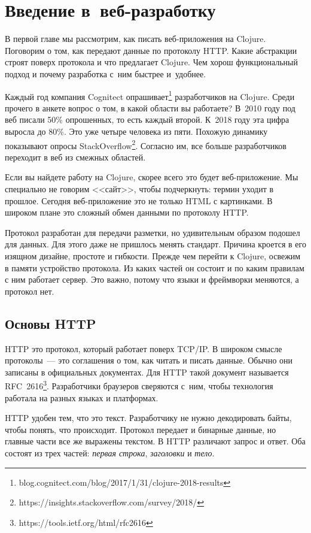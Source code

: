 \chapter{Введение в~веб-разработку}

\begin{teaser}
В первой главе мы рассмотрим, как писать веб-приложения на Clojure. Поговорим о
том, как передают данные по протоколу HTTP. Какие абстракции строят поверх
протокола и что предлагает Clojure. Чем хорош функциональный подход и почему
разработка с~ним быстрее и~удобнее.
\end{teaser}

Каждый год компания Cognitect опрашивает\footnote{blog.cognitect.com/blog/2017/1/31/clojure-2018-results}
разработчиков на Clojure. Среди прочего в анкете вопрос о том, в какой области вы работаете? В~2010 году под
веб писали 50\% опрошенных, то есть каждый второй. К~2018 году
эта цифра выросла до 80\%. Это уже четыре человека из пяти. Похожую динамику показывают
опросы StackOverflow\footnote{https://insights.stackoverflow.com/survey/2018/}.
Согласно им, все больше разработчиков переходит в веб из смежных областей.

Если вы найдете работу на Clojure, скорее всего это будет веб-приложение. Мы
специально не говорим <<сайт>>, чтобы подчеркнуть: термин уходит в
прошлое. Сегодня веб-приложение это не только HTML с картинками. В широком плане
это сложный обмен данными по протоколу HTTP.

Протокол разработан для передачи разметки, но удивительным образом подошел для
данных. Для этого даже не пришлось менять стандарт. Причина кроется в его
изящном дизайне, простоте и гибкости. Прежде чем перейти к Clojure, освежим в
памяти устройство протокола. Из каких частей он состоит и по каким правилам с
ним работает сервер. Это важно, потому что языки и фреймворки меняются, а
протокол нет.

\section{Основы HTTP}

HTTP это протокол, который работает поверх TCP/IP. В широком смысле протоколы~---
это соглашения о том, как читать и писать данные. Обычно они записаны в официальных
документах. Для HTTP такой документ называется RFC~2616\footnote{https://tools.ietf.org/html/rfc2616}.
Разработчики браузеров сверяются с~ним, чтобы технология работала
на разных языках и платформах.

HTTP удобен тем, что это текст. Разработчику не нужно декодировать байты, чтобы
понять, что происходит. Протокол передает и бинарные данные, но главные части
все же выражены текстом. В HTTP различают запрос и ответ. Оба состоят из трех
частей: \emph{первая строка}, \emph{заголовки} и \emph{тело}.


